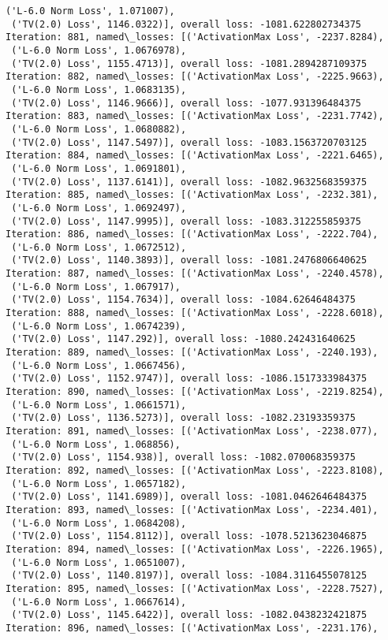 \documentclass[10pt]{article}
\begin{document}
\begin{Verbatim}[commandchars=\\\{\}]
 ('L-6.0 Norm Loss', 1.071007),
 ('TV(2.0) Loss', 1146.0322)], overall loss: -1081.622802734375
Iteration: 881, named\_losses: [('ActivationMax Loss', -2237.8284),
 ('L-6.0 Norm Loss', 1.0676978),
 ('TV(2.0) Loss', 1155.4713)], overall loss: -1081.2894287109375
Iteration: 882, named\_losses: [('ActivationMax Loss', -2225.9663),
 ('L-6.0 Norm Loss', 1.0683135),
 ('TV(2.0) Loss', 1146.9666)], overall loss: -1077.931396484375
Iteration: 883, named\_losses: [('ActivationMax Loss', -2231.7742),
 ('L-6.0 Norm Loss', 1.0680882),
 ('TV(2.0) Loss', 1147.5497)], overall loss: -1083.1563720703125
Iteration: 884, named\_losses: [('ActivationMax Loss', -2221.6465),
 ('L-6.0 Norm Loss', 1.0691801),
 ('TV(2.0) Loss', 1137.6141)], overall loss: -1082.9632568359375
Iteration: 885, named\_losses: [('ActivationMax Loss', -2232.381),
 ('L-6.0 Norm Loss', 1.0692497),
 ('TV(2.0) Loss', 1147.9995)], overall loss: -1083.312255859375
Iteration: 886, named\_losses: [('ActivationMax Loss', -2222.704),
 ('L-6.0 Norm Loss', 1.0672512),
 ('TV(2.0) Loss', 1140.3893)], overall loss: -1081.2476806640625
Iteration: 887, named\_losses: [('ActivationMax Loss', -2240.4578),
 ('L-6.0 Norm Loss', 1.067917),
 ('TV(2.0) Loss', 1154.7634)], overall loss: -1084.62646484375
Iteration: 888, named\_losses: [('ActivationMax Loss', -2228.6018),
 ('L-6.0 Norm Loss', 1.0674239),
 ('TV(2.0) Loss', 1147.292)], overall loss: -1080.242431640625
Iteration: 889, named\_losses: [('ActivationMax Loss', -2240.193),
 ('L-6.0 Norm Loss', 1.0667456),
 ('TV(2.0) Loss', 1152.9747)], overall loss: -1086.1517333984375
Iteration: 890, named\_losses: [('ActivationMax Loss', -2219.8254),
 ('L-6.0 Norm Loss', 1.0661571),
 ('TV(2.0) Loss', 1136.5273)], overall loss: -1082.23193359375
Iteration: 891, named\_losses: [('ActivationMax Loss', -2238.077),
 ('L-6.0 Norm Loss', 1.068856),
 ('TV(2.0) Loss', 1154.938)], overall loss: -1082.070068359375
Iteration: 892, named\_losses: [('ActivationMax Loss', -2223.8108),
 ('L-6.0 Norm Loss', 1.0657182),
 ('TV(2.0) Loss', 1141.6989)], overall loss: -1081.0462646484375
Iteration: 893, named\_losses: [('ActivationMax Loss', -2234.401),
 ('L-6.0 Norm Loss', 1.0684208),
 ('TV(2.0) Loss', 1154.8112)], overall loss: -1078.5213623046875
Iteration: 894, named\_losses: [('ActivationMax Loss', -2226.1965),
 ('L-6.0 Norm Loss', 1.0651007),
 ('TV(2.0) Loss', 1140.8197)], overall loss: -1084.3116455078125
Iteration: 895, named\_losses: [('ActivationMax Loss', -2228.7527),
 ('L-6.0 Norm Loss', 1.0667614),
 ('TV(2.0) Loss', 1145.6422)], overall loss: -1082.0438232421875
Iteration: 896, named\_losses: [('ActivationMax Loss', -2231.176),

\end{Verbatim}
\end{document}
